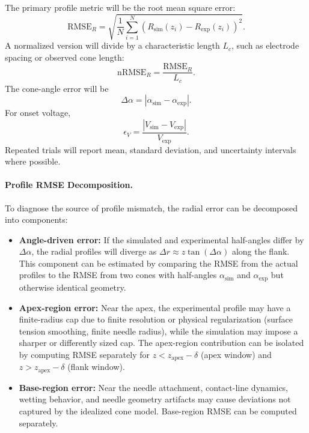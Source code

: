 The primary profile metric will be the root mean square error:
\begin{equation}
\mathrm{RMSE}_{R}=\sqrt{\frac{1}{N}\sum_{i=1}^{N}\left(R_{\mathrm{sim}}(z_i)-R_{\mathrm{exp}}(z_i)\right)^2}.
\end{equation}
A normalized version will divide by a characteristic length $L_c$, such as electrode spacing or observed cone length:
\begin{equation}
\mathrm{nRMSE}_{R}=\frac{\mathrm{RMSE}_{R}}{L_c}.
\end{equation}
The cone-angle error will be
\begin{equation}
\Delta\alpha=|\alpha_{\mathrm{sim}}-\alpha_{\mathrm{exp}}|.
\end{equation}
For onset voltage,
\begin{equation}
\epsilon_V=\frac{|V_{\mathrm{sim}}-V_{\mathrm{exp}}|}{V_{\mathrm{exp}}}.
\end{equation}
Repeated trials will report mean, standard deviation, and uncertainty intervals where possible.

\paragraph{Profile RMSE Decomposition.} To diagnose the source of profile mismatch, the radial error can be decomposed into components:
\begin{itemize}
    \item \textbf{Angle-driven error:} If the simulated and experimental half-angles differ by $\Delta\alpha$, the radial profiles will diverge as $\Delta r \approx z \tan(\Delta\alpha)$ along the flank. This component can be estimated by comparing the RMSE from the actual profiles to the RMSE from two cones with half-angles $\alpha_{\mathrm{sim}}$ and $\alpha_{\mathrm{exp}}$ but otherwise identical geometry.
    \item \textbf{Apex-region error:} Near the apex, the experimental profile may have a finite-radius cap due to finite resolution or physical regularization (surface tension smoothing, finite needle radius), while the simulation may impose a sharper or differently sized cap. The apex-region contribution can be isolated by computing RMSE separately for $z < z_{\text{apex}} - \delta$ (apex window) and $z > z_{\text{apex}} - \delta$ (flank window).
    \item \textbf{Base-region error:} Near the needle attachment, contact-line dynamics, wetting behavior, and needle geometry artifacts may cause deviations not captured by the idealized cone model. Base-region RMSE can be computed separately.
\end{itemize}

